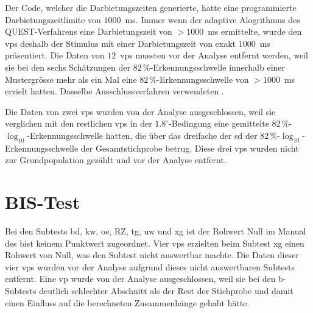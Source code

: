 \documentclass[11pt, twoside, a4paper]{book}		%
\begin{document}
Der Code, welcher die Darbietungszeiten generierte, hatte eine programmierte Darbietungszeitlimite von $1000$~ms. Immer wenn der adaptive Alogrithmus des QUEST-Verfahrens \citep{Watson1983} eine Darbietungszeit von $> 1000$~ms ermittelte, wurde den \glspl{vp} deshalb der Stimulus mit einer Darbietungszeit von exakt $1000$~ms präsentiert. 
Die Daten von $12$~\glspl{vp} mussten vor der Analyse entfernt werden, weil sie bei den sechs Schätzungen der $82\,\%$-Er\-ken\-nungs\-schwel\-le innerhalb einer Mustergrösse mehr als ein Mal eine $82\,\%$-Er\-ken\-nungs\-schwel\-le von $> 1000$~ms erzielt hatten. Dasselbe Ausschlussverfahren verwendeten \citet{Melnick2013}.

Die Daten von zwei \glspl{vp} wurden von der Analyse ausgeschlossen, weil sie verglichen mit den restlichen \glspl{vp} in der $1.8^{\circ}$-Be\-ding\-ung eine gemittelte $82\,\%$-$\log_{10}$-Er\-ken\-nungs\-schwel\-le hatten, die über das dreifache der \gls{sd} der $82\,\%$-$\log_{10}$-Er\-ken\-nungs\-schwel\-le der Gesamtstichprobe betrug. Diese drei \glspl{vp} wurden nicht zur Grundpopulation gezählt und vor der Analyse entfernt.


\section{BIS-Test}
Bei den Subtests \gls{bd}, \gls{kw}, \gls{oe}, \gls{RZ}, \gls{tg}, \gls{uw} und \gls{xg} ist der Rohwert Null im Manual des \gls{bist} \citep{Jaeger1997} keinem Punktwert zugeordnet. Vier \glspl{vp} erzielten beim Subtest \gls{xg} einen Rohwert von Null, was den Subtest nicht auswertbar machte. Die Daten dieser vier \glspl{vp} wurden vor der Analyse aufgrund dieses nicht auswertbaren Subtests entfernt. Eine \gls{vp} wurde von der Analyse ausgeschlossen, weil sie bei den \gls{b}-Subtests deutlich schlechter Abschnitt als der Rest der Stichprobe und damit einen Einfluss auf die berechneten Zusammenhänge gehabt hätte.
\end{document}

